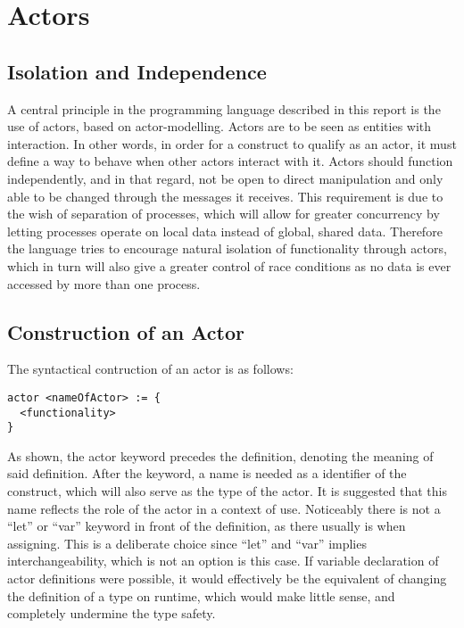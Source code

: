\section{Actors}


\subsection{Isolation and Independence}

A central principle in the programming language described in this report is the use of actors, based on actor-modelling. Actors are to be seen as entities with interaction. In other words, in order for a construct to qualify as an actor, it must define a way to behave when other actors interact with it. Actors should function independently, and in that regard, not be open to direct manipulation and only able to be changed through the messages it receives. This requirement is due to the wish of separation of processes, which will allow for greater concurrency by letting processes operate on local data instead of global, shared data. Therefore the language tries to encourage natural isolation of functionality through actors, which in turn will also give a greater control of race conditions as no data is ever accessed by more than one process.

\subsection{Construction of an Actor}

The syntactical contruction of an actor is as follows:

\begin{lstlisting}
actor <nameOfActor> := {
  <functionality>
}
\end{lstlisting}

As shown, the actor keyword precedes the definition, denoting the meaning of said definition. After the keyword, a name is needed as a identifier of the construct, which will also serve as the type of the actor. It is suggested that this name reflects the role of the actor in a context of use. Noticeably there is not a \enquote{let} or \enquote{var} keyword in front of the definition, as there usually is when assigning. This is a deliberate choice since \enquote{let} and \enquote{var} implies interchangeability, which is not an option is this case. If variable declaration of actor definitions were possible, it would effectively be the equivalent of changing the definition of a type on runtime, which would make little sense, and completely undermine the type safety.

